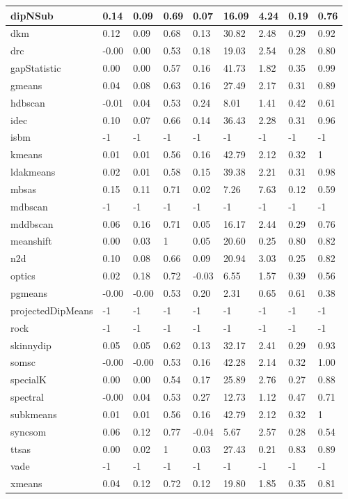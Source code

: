 \begin{table}[H]
\begin{tabular}{|l|l|l|l|l|l|l|l|l|}
\hline
dipNSub & 0.14 & 0.09 & 0.69 & 0.07 & 16.09 & 4.24 & 0.19 & 0.76 \\
\hline
dkm & 0.12 & 0.09 & 0.68 & 0.13 & 30.82 & 2.48 & 0.29 & 0.92 \\
\hline
drc & -0.00 & 0.00 & 0.53 & 0.18 & 19.03 & 2.54 & 0.28 & 0.80 \\
\hline
gapStatistic & 0.00 & 0.00 & 0.57 & 0.16 & 41.73 & 1.82 & 0.35 & 0.99 \\
\hline
gmeans & 0.04 & 0.08 & 0.63 & 0.16 & 27.49 & 2.17 & 0.31 & 0.89 \\
\hline
hdbscan & -0.01 & 0.04 & 0.53 & 0.24 & 8.01 & 1.41 & 0.42 & 0.61 \\
\hline
idec & 0.10 & 0.07 & 0.66 & 0.14 & 36.43 & 2.28 & 0.31 & 0.96 \\
\hline
isbm & -1 & -1 & -1 & -1 & -1 & -1 & -1 & -1 \\
\hline
kmeans & 0.01 & 0.01 & 0.56 & 0.16 & 42.79 & 2.12 & 0.32 & 1 \\
\hline
ldakmeans & 0.02 & 0.01 & 0.58 & 0.15 & 39.38 & 2.21 & 0.31 & 0.98 \\
\hline
mbsas & 0.15 & 0.11 & 0.71 & 0.02 & 7.26 & 7.63 & 0.12 & 0.59 \\
\hline
mdbscan & -1 & -1 & -1 & -1 & -1 & -1 & -1 & -1 \\
\hline
mddbscan & 0.06 & 0.16 & 0.71 & 0.05 & 16.17 & 2.44 & 0.29 & 0.76 \\
\hline
meanshift & 0.00 & 0.03 & 1 & 0.05 & 20.60 & 0.25 & 0.80 & 0.82 \\
\hline
n2d & 0.10 & 0.08 & 0.66 & 0.09 & 20.94 & 3.03 & 0.25 & 0.82 \\
\hline
optics & 0.02 & 0.18 & 0.72 & -0.03 & 6.55 & 1.57 & 0.39 & 0.56 \\
\hline
pgmeans & -0.00 & -0.00 & 0.53 & 0.20 & 2.31 & 0.65 & 0.61 & 0.38 \\
\hline
projectedDipMeans & -1 & -1 & -1 & -1 & -1 & -1 & -1 & -1 \\
\hline
rock & -1 & -1 & -1 & -1 & -1 & -1 & -1 & -1 \\
\hline
skinnydip & 0.05 & 0.05 & 0.62 & 0.13 & 32.17 & 2.41 & 0.29 & 0.93 \\
\hline
somsc & -0.00 & -0.00 & 0.53 & 0.16 & 42.28 & 2.14 & 0.32 & 1.00 \\
\hline
specialK & 0.00 & 0.00 & 0.54 & 0.17 & 25.89 & 2.76 & 0.27 & 0.88 \\
\hline
spectral & -0.00 & 0.04 & 0.53 & 0.27 & 12.73 & 1.12 & 0.47 & 0.71 \\
\hline
subkmeans & 0.01 & 0.01 & 0.56 & 0.16 & 42.79 & 2.12 & 0.32 & 1 \\
\hline
syncsom & 0.06 & 0.12 & 0.77 & -0.04 & 5.67 & 2.57 & 0.28 & 0.54 \\
\hline
ttsas & 0.00 & 0.02 & 1 & 0.03 & 27.43 & 0.21 & 0.83 & 0.89 \\
\hline
vade & -1 & -1 & -1 & -1 & -1 & -1 & -1 & -1 \\
\hline
xmeans & 0.04 & 0.12 & 0.72 & 0.12 & 19.80 & 1.85 & 0.35 & 0.81 \\
\hline
\end{tabular}
\end{table}



